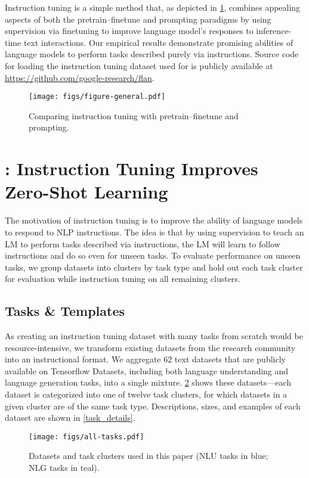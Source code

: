 Instruction tuning is a simple method that, as depicted in \cref{fig:flan-paradigm}, combines appealing aspects of both the pretrain--finetune and prompting paradigms by using supervision via finetuning to improve language model's responses to inference-time text interactions.
Our empirical results demonstrate promising abilities of language models to perform tasks described purely via instructions.
Source code for loading the instruction tuning dataset used for \flan{} is publicly available at \url{https://github.com/google-research/flan}.

\begin{figure}[h]
    \centering
    \texttt{[image: figs/figure-general.pdf]}
    \vspace{-1mm}
    \caption{Comparing instruction tuning with pretrain--finetune and prompting.}
    \label{fig:flan-paradigm}
\end{figure}

\section{\flan: Instruction Tuning Improves Zero-Shot Learning}
The motivation of instruction tuning is to improve the ability of language models to respond to NLP instructions.
The idea is that by using supervision to teach an LM to perform tasks described via instructions, the LM will learn to follow instructions and do so even for unseen tasks. 
To evaluate performance on unseen tasks, we group datasets into clusters by task type and hold out each task cluster for evaluation while instruction tuning on all remaining clusters.

\subsection{Tasks \& Templates}\label{subsec:tasks_and_templates}
As creating an instruction tuning dataset with many tasks from scratch would be resource-intensive, we transform existing datasets from the research community into an instructional format. 
We aggregate 62 text datasets that are publicly available on Tensorflow Datasets, including both language understanding and language generation tasks, into a single mixture.
\cref{fig:flan-clusters} shows these datasets---each dataset is categorized into one of twelve task clusters, for which datasets in a given cluster are of the same task type. 
Descriptions, sizes, and examples of each dataset are shown in \cref{task_details}.
\vspace{-1mm}
\begin{figure}[h]
    \centering
    \texttt{[image: figs/all-tasks.pdf]}
    \vspace{-7mm}
    \caption{Datasets and task clusters used in this paper (NLU tasks in blue; NLG tasks in teal).}
    \vspace{-2mm}
    \label{fig:flan-clusters}
\end{figure}

